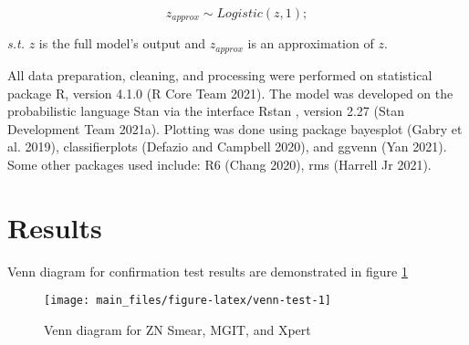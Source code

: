 \documentclass[
]{article}
\begin{document}
\[
z_{approx} \sim Logistic(z, 1);
\]

\emph{s.t.} \(z\) is the full model's output and \(z_{approx}\) is an approximation of \(z\).

All data preparation, cleaning, and processing were performed on statistical package R, version 4.1.0 (R Core Team 2021). The model was developed on the probabilistic language Stan via the interface Rstan , version 2.27 (Stan Development Team 2021a). Plotting was done using package bayesplot (Gabry et al. 2019), classifierplots (Defazio and Campbell 2020), and ggvenn (Yan 2021). Some other packages used include: R6 (Chang 2020), rms (Harrell Jr 2021).

\hypertarget{results}{%
\section{Results}\label{results}}

Venn diagram for confirmation test results are demonstrated in figure \ref{fig:venn-test}

\begin{figure}

{\centering \texttt{[image: main\_files/figure-latex/venn-test-1]} 

}

\caption{Venn diagram for ZN Smear, MGIT, and Xpert}\label{fig:venn-test}
\end{figure}

\providecommand{\docline}[3]{\noalign{\global\setlength{\arrayrulewidth}{#1}}\arrayrulecolor[HTML]{#2}\cline{#3}}

\setlength{\tabcolsep}{2pt}

\renewcommand*{\arraystretch}{1.5}
\end{document}
